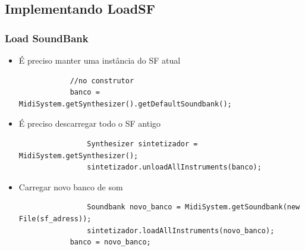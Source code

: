\documentclass{beamer}
\begin{document}
\subsection{Implementando LoadSF}
\begin{frame}[fragile]
  \frametitle{Load SoundBank}
	\begin{itemize}
   		\item É preciso manter uma instância do SF atual   
   		\begin{tiny}
		\begin{lstlisting}
			//no construtor
	   		banco = MidiSystem.getSynthesizer().getDefaultSoundbank();		
    			\end{lstlisting}
   		\end{tiny}    	
    		\item É preciso descarregar todo o SF antigo
	\begin{tiny}\begin{lstlisting}
    			Synthesizer sintetizador = MidiSystem.getSynthesizer();
				sintetizador.unloadAllInstruments(banco);
    			\end{lstlisting}\end{tiny}   	 	
   	 	\item Carregar novo banco de som
   	 	\begin{tiny}\begin{lstlisting}
		    	Soundbank novo_banco = MidiSystem.getSoundbank(new File(sf_adress));
    			sintetizador.loadAllInstruments(novo_banco);
			banco = novo_banco;
    			\end{lstlisting}\end{tiny}
     \end{itemize}
     
\begin{lstlisting}

	



\end{lstlisting}
\end{frame}
\end{document}

